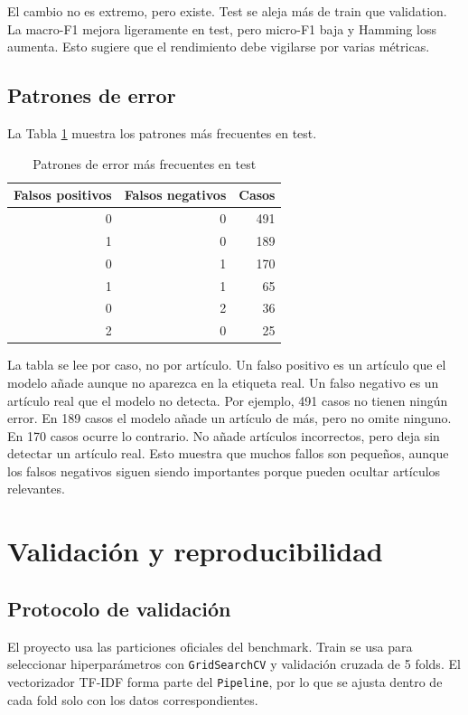 \documentclass[11pt,a4paper]{article}
\begin{document}
El cambio no es extremo, pero existe. Test se aleja más de train que validation. La macro-F1 mejora ligeramente en test, pero micro-F1 baja y Hamming loss aumenta. Esto sugiere que el rendimiento debe vigilarse por varias métricas.

\subsection{Patrones de error}

La Tabla \ref{tab_errores} muestra los patrones más frecuentes en test.

\begin{table}[H]
\centering
\caption{Patrones de error más frecuentes en test}
\label{tab_errores}
\small
\begin{tabular}{@{}rrr@{}}
\toprule
\textbf{Falsos positivos} & \textbf{Falsos negativos} & \textbf{Casos}\\
\midrule
0 & 0 & 491\\
1 & 0 & 189\\
0 & 1 & 170\\
1 & 1 & 65\\
0 & 2 & 36\\
2 & 0 & 25\\
\bottomrule
\end{tabular}
\end{table}

La tabla se lee por caso, no por artículo. Un falso positivo es un artículo que el modelo añade aunque no aparezca en la etiqueta real. Un falso negativo es un artículo real que el modelo no detecta. Por ejemplo, 491 casos no tienen ningún error. En 189 casos el modelo añade un artículo de más, pero no omite ninguno. En 170 casos ocurre lo contrario. No añade artículos incorrectos, pero deja sin detectar un artículo real. Esto muestra que muchos fallos son pequeños, aunque los falsos negativos siguen siendo importantes porque pueden ocultar artículos relevantes.

\section{Validación y reproducibilidad}
\label{sec_validacion}

\subsection{Protocolo de validación}

El proyecto usa las particiones oficiales del benchmark. Train se usa para seleccionar hiperparámetros con \texttt{GridSearchCV} y validación cruzada de 5 folds. El vectorizador TF-IDF forma parte del \texttt{Pipeline}, por lo que se ajusta dentro de cada fold solo con los datos correspondientes.
\end{document}
